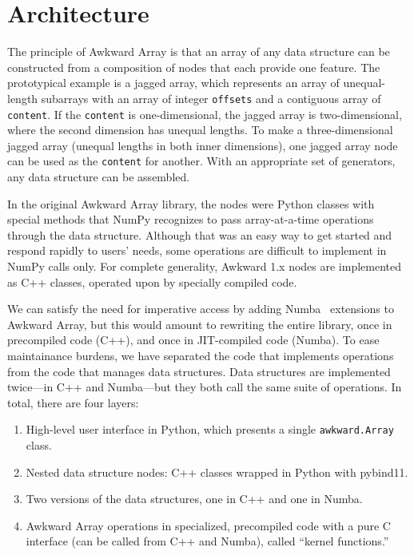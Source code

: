 \documentclass{webofc}
\begin{document}
\section{Architecture}

The principle of Awkward Array is that an array of any data structure can be constructed from a composition of nodes that each provide one feature. The prototypical example is a jagged array, which represents an array of unequal-length subarrays with an array of integer \texttt{offsets} and a contiguous array of \texttt{content}. If the \texttt{content} is one-dimensional, the jagged array is two-dimensional, where the second dimension has unequal lengths. To make a three-dimensional jagged array (unequal lengths in both inner dimensions), one jagged array node can be used as the \texttt{content} for another. With an appropriate set of generators, any data structure can be assembled.

In the original Awkward Array library, the nodes were Python classes with special methods that NumPy recognizes to pass array-at-a-time operations through the data structure. Although that was an easy way to get started and respond rapidly to users' needs, some operations are difficult to implement in NumPy calls only. For complete generality, Awkward 1.x nodes are implemented as C++ classes, operated upon by specially compiled code.

We can satisfy the need for imperative access by adding Numba~\cite{numba} extensions to Awkward Array, but this would amount to rewriting the entire library, once in precompiled code (C++), and once in JIT-compiled code (Numba). To ease maintainance burdens, we have separated the code that implements operations from the code that manages data structures. Data structures are implemented twice---in C++ and Numba---but they both call the same suite of operations. In total, there are four layers:

\begin{enumerate}
\item High-level user interface in Python, which presents a single \texttt{awkward.Array} class.
\item Nested data structure nodes: C++ classes wrapped in Python with pybind11.
\item Two versions of the data structures, one in C++ and one in Numba.
\item Awkward Array operations in specialized, precompiled code with a pure C interface (can be called from C++ and Numba), called ``kernel functions.''
\end{enumerate}
\end{document}
